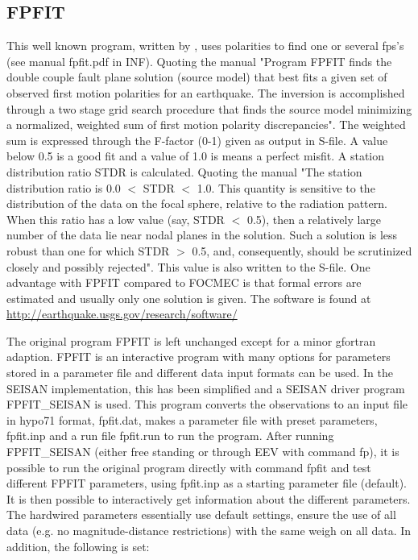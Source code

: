 \subsection{FPFIT}
\label{FPFIT}

This well known program, written by \cite{reasenberg1985}, 
uses polarities to find one or several fps's (see manual fpfit.pdf in INF). 
Quoting the manual "Program FPFIT finds the double couple fault plane 
solution (source model) that best fits a given set of observed first 
motion polarities for an earthquake. The inversion is accomplished 
through a two stage grid search procedure that finds the source model 
minimizing a normalized, weighted sum of first motion polarity discrepancies". 
The weighted sum is expressed through the F-factor (0-1) given as output 
in S-file. A value below 0.5 is a good fit and a value of 1.0 is means 
a perfect misfit. A station distribution ratio STDR is calculated. 
Quoting the manual  "The station distribution ratio is 0.0 $<$ STDR $<$ 1.0. 
This quantity is sensitive to the distribution of the data on the focal 
sphere, relative to the radiation pattern. When this ratio has a low 
value (say, STDR $<$ 0.5), then a relatively large number of the data 
lie near nodal planes in the solution. Such a solution is less robust 
than one for which STDR $>$ 0.5, and, consequently, should be scrutinized 
closely and possibly rejected". This value is also written to the S-file.  
One advantage with FPFIT compared to FOCMEC is that formal errors are 
estimated and usually only one solution is given. The software is found at 
\url{http://earthquake.usgs.gov/research/software/} 

The original program FPFIT is left unchanged except for a minor gfortran adaption. FPFIT is an interactive program with many options for parameters stored in a parameter file and different data input formats can be used. In the SEISAN implementation, this has been simplified and a SEISAN driver program FPFIT\_SEISAN is used. This program converts the observations to an input file in hypo71 format, fpfit.dat, makes a parameter file with preset parameters, fpfit.inp and a run file fpfit.run to run the program. After running FPFIT\_SEISAN (either free standing or through EEV with command fp), it is possible to run the original program directly with command fpfit and test different FPFIT parameters, using fpfit.inp as a starting parameter file (default). It is then possible to interactively get information about the different parameters. The hardwired parameters essentially use default settings,  ensure the use of all data (e.g. no magnitude-distance restrictions) with the same weigh on all data. In addition, the following is set:

